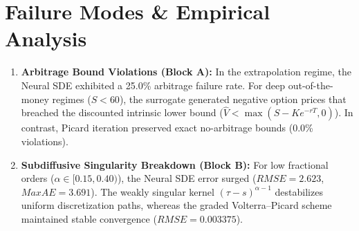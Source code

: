 \documentclass[10pt,twocolumn,a4paper]{article}
\begin{document}
\section{Failure Modes \& Empirical Analysis}
\begin{enumerate}
    \item \textbf{Arbitrage Bound Violations (Block A):} In the extrapolation regime, the Neural SDE exhibited a 25.0\% arbitrage failure rate. For deep out-of-the-money regimes ($S < 60$), the surrogate generated negative option prices that breached the discounted intrinsic lower bound ($\hat{V} < \max(S - K e^{-rT}, 0)$). In contrast, Picard iteration preserved exact no-arbitrage bounds (0.0\% violations).
    \item \textbf{Subdiffusive Singularity Breakdown (Block B):} For low fractional orders ($\alpha \in [0.15, 0.40)$), the Neural SDE error surged ($RMSE = 2.623$, $MaxAE = 3.691$). The weakly singular kernel $(\tau - s)^{\alpha - 1}$ destabilizes uniform discretization paths, whereas the graded Volterra--Picard scheme maintained stable convergence ($RMSE = 0.003375$).
\end{enumerate}
\end{document}
